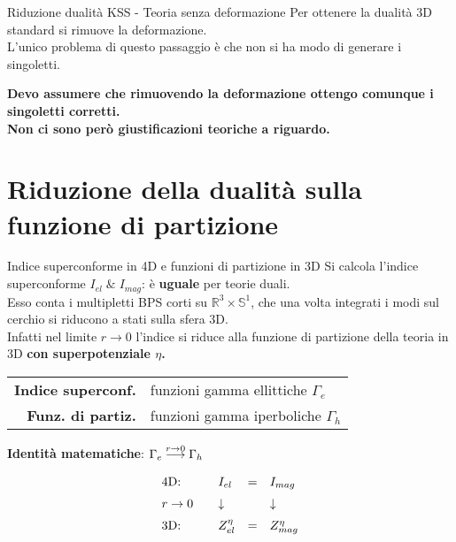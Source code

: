\documentclass[10pt,compress,usenames,dvipsnames]{beamer}
\begin{document}
\begin{frame}{Riduzione dualità KSS - Teoria senza deformazione }
Per ottenere la dualità 3D standard si rimuove la deformazione.\\
L'unico problema di questo passaggio è che non si ha modo di generare i singoletti.
\\
\vspace{0,5cm}
\begin{center}
{\bfseries Devo assumere che rimuovendo la deformazione ottengo comunque i singoletti corretti.\\[0,3cm]
\alert{Non ci sono però giustificazioni teoriche a riguardo.}
}
\end{center}

\end{frame}





\section{Riduzione della dualità sulla funzione di partizione}

\begin{frame}{Indice superconforme in 4D e funzioni di partizione in 3D} 
Si calcola l'indice superconforme $I_{el} \; \& \; I_{mag} $: è \alert{\bfseries uguale} per teorie duali.\\
Esso conta i multipletti BPS corti su $\mathbb{R}^3 \times \mathbb{S}^1$,
che una volta integrati i modi sul cerchio si riducono a stati sulla sfera 3D.
\\
\vspace{0,2cm}
Infatti nel limite $r \rightarrow 0$ l'indice si riduce alla funzione di partizione della teoria in 3D \alert{\bfseries con superpotenziale $\eta$.}\\
\begin{table}
\begin{tabular}{r l }
{\bfseries Indice superconf.} & funzioni gamma ellittiche $\Gamma_e $
\\
{\bfseries Funz. di partiz.} & funzioni gamma iperboliche $\Gamma_h$
\end{tabular}
\end{table}
\begin{center}
{\bfseries Identità matematiche}: $ \Gamma_e  \overset{\small{ r \rightarrow 0}}{\longrightarrow} \Gamma_h $
\end{center}
\begin{equation*}
\begin{array}{l l l l }
\hbox{4D:}  \qquad  & I_{el} & =  &I_{mag}   \\[0,2cm]
r \rightarrow 0 &\large{\downarrow }&   & \large{\downarrow   } \\[0,2cm]
\hbox{3D:} \qquad & Z^{\eta}_{el} & =&  Z^{\eta}_{mag} \end{array}
\end{equation*}
\end{frame}
\end{document}
